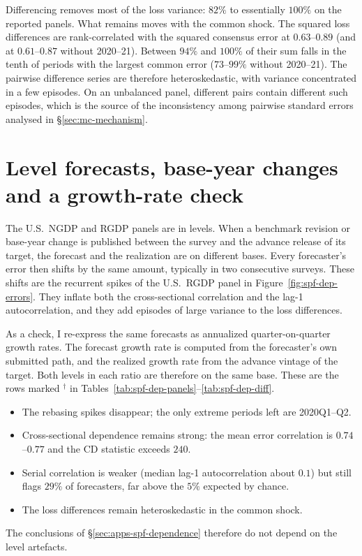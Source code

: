 \begin{appendix}
Differencing removes most of the loss variance: $82\%$ to essentially $100\%$ on the
reported panels. What remains moves with the common shock. The squared loss differences
are rank-correlated with the squared consensus error at $0.63$--$0.89$ (and at
$0.61$--$0.87$ without 2020--21). Between $94\%$ and $100\%$ of their sum falls in the
tenth of periods with the largest common error ($73$--$99\%$ without 2020--21). The
pairwise difference series are therefore heteroskedastic, with variance concentrated in
a few episodes. On an unbalanced panel, different pairs contain different
such episodes, which is the source of the inconsistency among pairwise standard errors
analysed in \S\ref{sec:mc-mechanism}.

\tabSpfDepDiff

\section{Level forecasts, base-year changes and a growth-rate check}
\label{app:spf-dep-rebasing}

The U.S.\ NGDP and RGDP panels are in levels. When a benchmark revision or base-year
change is published between the survey and the advance release of its target, the
forecast and the realization are on different bases. Every forecaster's error then
shifts by the same amount, typically in two consecutive surveys. These shifts are the
recurrent spikes of the U.S.\ RGDP panel in Figure~\ref{fig:spf-dep-errors}. They
inflate both the cross-sectional correlation and the lag-1 autocorrelation, and they add
episodes of large variance to the loss differences.

As a check, I re-express the same forecasts as annualized quarter-on-quarter growth
rates. The forecast growth rate is computed from the forecaster's own submitted path, and
the realized growth rate from the advance vintage of the target. Both levels in each
ratio are therefore on the same base. These are the rows marked $^\dagger$ in
Tables~\ref{tab:spf-dep-panels}--\ref{tab:spf-dep-diff}.
\begin{itemize}[leftmargin=*]
  \item The rebasing spikes disappear; the only extreme periods left are 2020Q1--Q2.
  \item Cross-sectional dependence remains strong: the mean error correlation is
    $0.74$--$0.77$ and the CD statistic exceeds $240$.
  \item Serial correlation is weaker (median lag-1 autocorrelation about $0.1$) but still
    flags $29\%$ of forecasters, far above the $5\%$ expected by chance.
  \item The loss differences remain heteroskedastic in the common shock.
\end{itemize}
The conclusions of \S\ref{sec:apps-spf-dependence} therefore do not depend on the level
artefacts.

\end{appendix}
